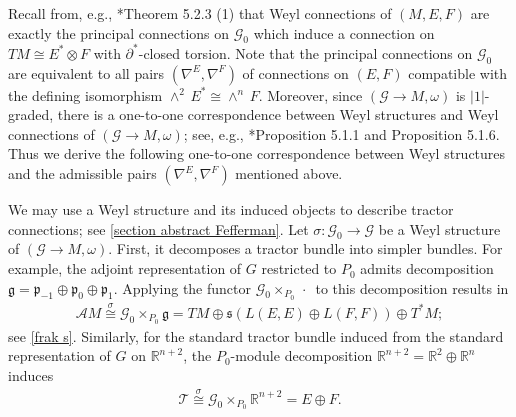 \documentclass[11pt]{amsart}
\newtheorem{lemma}[proposition]{Lemma}
\begin{document}
Recall from, e.g., \cite{Book}*{Theorem 5.2.3 (1)} that Weyl connections of $(M,E,F)$ are exactly the principal connections on $\mathcal G_0$ which induce a connection on $TM\cong E^*\otimes F$ with $\partial^*$-closed torsion. Note that the principal connections on $\mathcal G_0$ are equivalent to all pairs $(\nabla^E,\nabla^F)$ of connections on $(E,F)$ compatible with the defining isomorphism $\wedge^2\, E^*\cong \wedge^n\,F$. Moreover,  since $(\mathcal G\to M,\omega)$ is $|1|$-graded, there is a one-to-one correspondence between Weyl structures and Weyl connections of $(\mathcal G\to M,\omega)$; see, e.g., \cite{Book}*{Proposition 5.1.1 and Proposition 5.1.6}. Thus we derive the following one-to-one correspondence between Weyl structures and the admissible pairs $(\nabla^E,\nabla^F)$ mentioned above.
We may use a Weyl structure and its induced objects to describe tractor connections; see \cref{section abstract Fefferman}. Let $\sigma:\mathcal G_0\to\mathcal G$ be a Weyl structure of $(\mathcal G\to M,\omega)$. First, it decomposes a tractor bundle into simpler bundles. For example, the adjoint representation of $G$ restricted to $P_0$ admits decomposition $\mathfrak g=\mathfrak p_{-1}\oplus\mathfrak p_0\oplus\mathfrak p_1$. Applying the functor $\mathcal G_0\times_{P_0}\,\cdot\,$ to this decomposition results in
\begin{align}\label{adjoint bundle decomposition}
    \mathcal AM\stackrel{\sigma}{\cong}\mathcal G_0\times_{P_0}\mathfrak g=TM\oplus \mathfrak s(L(E,E)\oplus L(F,F))\oplus T^*M;
\end{align}
see \eqref{frak s}.
Similarly, for the standard tractor bundle induced from the standard representation of $G$ on $\mathbb R^{n+2}$, the $P_0$-module decomposition $\mathbb R^{n+2}=\mathbb R^2\oplus\mathbb R^n$ induces
\begin{align}\label{standard tractor splitting}
    \mathcal T\stackrel{\sigma}{\cong}\mathcal G_0\times_{P_0}\mathbb R^{n+2}=E\oplus F.
\end{align}
\end{document}
